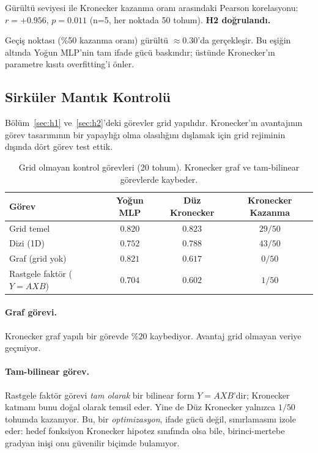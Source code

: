 \documentclass[11pt,a4paper]{article}
\begin{document}
Gürültü seviyesi ile Kronecker kazanma oranı arasındaki Pearson
korelasyonu: $r = +0.956$, $p = 0.011$ (n=5, her noktada 50 tohum).
\textbf{H2 doğrulandı.}

Geçiş noktası (\%50 kazanma oranı) gürültü $\approx 0.30$'da
gerçekleşir. Bu eşiğin altında Yoğun MLP'nin tam ifade gücü
baskındır; üstünde Kronecker'ın parametre kısıtı overfitting'i
önler.


\subsection{Sirküler Mantık Kontrolü}
\label{sec:non-grid}

Bölüm~\ref{sec:h1} ve~\ref{sec:h2}'deki görevler grid yapılıdır.
Kronecker'ın avantajının görev tasarımının bir yapaylığı olma
olasılığını dışlamak için grid rejiminin dışında dört görev test
ettik.

\begin{table}[h]
\centering
\caption{Grid olmayan kontrol görevleri (20 tohum). Kronecker graf
ve tam-bilinear görevlerde kaybeder.}
\label{tab:non-grid}
\small
\begin{tabular}{lccc}
\toprule
Görev & Yoğun MLP & Düz Kronecker & Kronecker Kazanma \\
\midrule
Grid temel                & $0.820$ & $0.823$ & $29/50$ \\
Dizi (1D)                 & $0.752$ & $\mathbf{0.788}$ & $43/50$ \\
Graf (grid yok)           & $\mathbf{0.821}$ & $0.617$ & $0/50$ \\
Rastgele faktör ($Y=AXB$) & $\mathbf{0.704}$ & $0.602$ & $1/50$ \\
\bottomrule
\end{tabular}
\end{table}

\paragraph{Graf görevi.}
Kronecker graf yapılı bir görevde $\%20$ kaybediyor. Avantaj
grid olmayan veriye geçmiyor.

\paragraph{Tam-bilinear görev.}
Rastgele faktör görevi \emph{tam olarak} bir bilinear form
$Y = AXB$'dir; Kronecker katmanı bunu doğal olarak temsil eder.
Yine de Düz Kronecker yalnızca $1/50$ tohumda kazanıyor. Bu,
bir \emph{optimizasyon}, ifade gücü değil, sınırlamasını izole
eder: hedef fonksiyon Kronecker hipotez sınıfında olsa bile,
birinci-mertebe gradyan inişi onu güvenilir biçimde bulamıyor.
\end{document}
